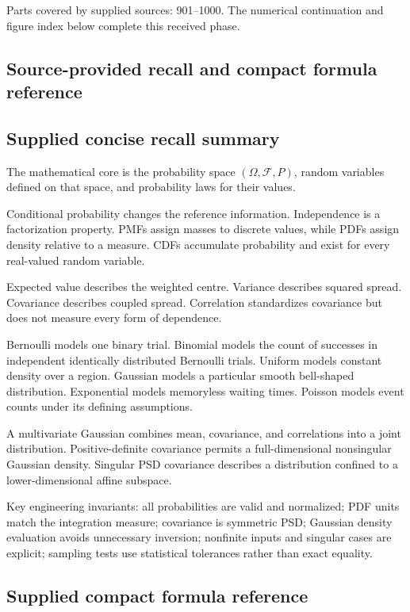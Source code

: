 Parts covered by supplied sources: 901--1000. The numerical continuation and figure index below complete this received phase.

\subsection{Source-provided recall and compact formula reference}\label{source-provided-recall-and-compact-formula-reference}

\subsection{Supplied concise recall summary}\label{supplied-concise-recall-summary}

The mathematical core is the probability space \((\Omega,\mathcal F,P)\), random variables defined on that space, and probability laws for their values.

Conditional probability changes the reference information. Independence is a factorization property. PMFs assign masses to discrete values, while PDFs assign density relative to a measure. CDFs accumulate probability and exist for every real-valued random variable.

Expected value describes the weighted centre. Variance describes squared spread. Covariance describes coupled spread. Correlation standardizes covariance but does not measure every form of dependence.

Bernoulli models one binary trial. Binomial models the count of successes in independent identically distributed Bernoulli trials. Uniform models constant density over a region. Gaussian models a particular smooth bell-shaped distribution. Exponential models memoryless waiting times. Poisson models event counts under its defining assumptions.

A multivariate Gaussian combines mean, covariance, and correlations into a joint distribution. Positive-definite covariance permits a full-dimensional nonsingular Gaussian density. Singular PSD covariance describes a distribution confined to a lower-dimensional affine subspace.

Key engineering invariants: all probabilities are valid and normalized; PDF units match the integration measure; covariance is symmetric PSD; Gaussian density evaluation avoids unnecessary inversion; nonfinite inputs and singular cases are explicit; sampling tests use statistical tolerances rather than exact equality.

\subsection{Supplied compact formula reference}\label{supplied-compact-formula-reference}

